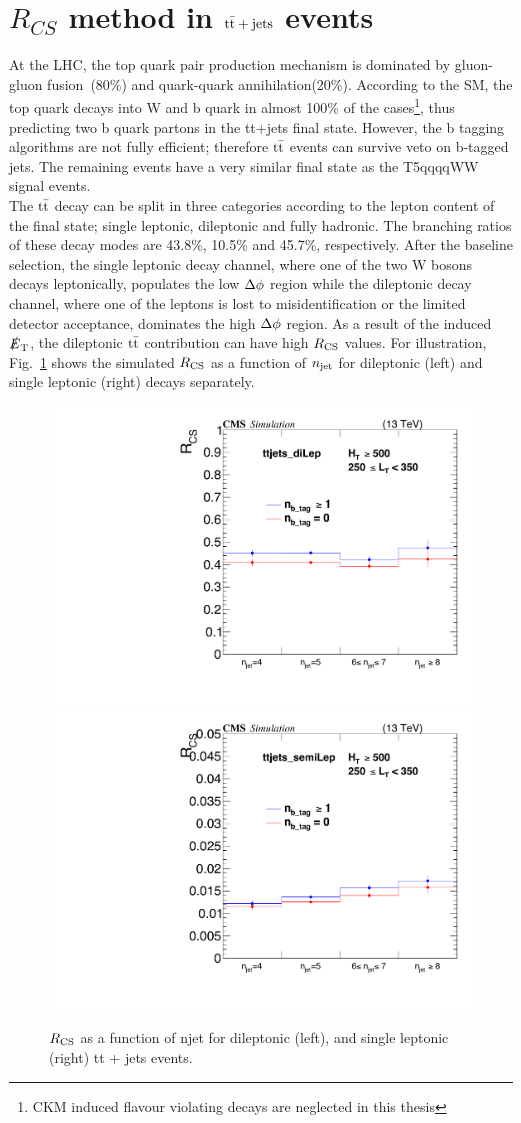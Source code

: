 \section{$R_{CS}$ method in ${\rm t\bar{t}+jets}$ events}
\label{sec:RcsTT}
At the LHC, the top quark pair production mechanism is dominated by gluon-gluon fusion~(80\%) and quark-quark annihilation(20\%). According to the SM, the top quark decays into W and b quark in almost 100\% of the cases\footnote{CKM induced flavour violating decays are neglected in this thesis}, thus predicting two b quark partons in the tt+jets final state. However, the b tagging algorithms are not fully efficient; therefore $\rm t\bar{t}$ events can survive veto on b-tagged jets. The remaining events have a very similar final state as the T5qqqqWW signal events.\\
The $\rm t\bar{t}$ decay can be split in three categories according to the lepton content of the final state; single leptonic, dileptonic and fully hadronic. The branching ratios of these decay modes are 43.8\%, 10.5\% and 45.7\%, respectively.  After the baseline selection, the single leptonic decay channel, where one of the two W bosons decays leptonically, populates the low $\Delta \phi$ region while the dileptonic decay channel, where one of the leptons is lost to misidentification or the limited detector acceptance, dominates the high $\Delta \phi$ region. As a result of the induced $\slashed{E}_{\rm T}$, the dileptonic $\rm t\bar{t}$ contribution can have high $R_{\rm CS}$ values. For illustration, Fig.~\ref{rcsMCtt} shows the simulated $R_{\rm CS}$ as a function of $n_{\rm jet}$ for dileptonic (left) and single leptonic (right) decays separately.
\begin{figure}[!hbt]
    \begin{center}
 \includegraphics[width=0.45 \textwidth]{Plots/analysis/RCS/dilep}
    \includegraphics[width=0.45 \textwidth]{Plots/analysis/RCS/semilep}
  \caption{ \label{rcsMCtt}  $R_{\rm CS}$ as a function of njet for dileptonic (left), and single leptonic (right) tt + jets events. }
  \end{center}
\end{figure}
